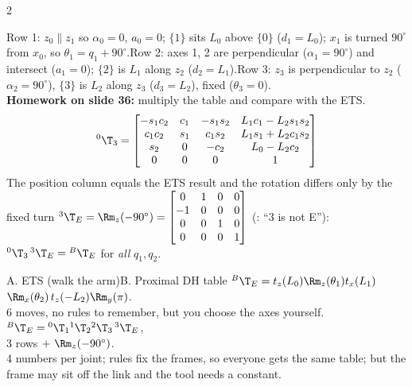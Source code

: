 \begin{multicols}{2}
\columnbreak
{}
\begin{worked}
\begin{center}\end{center}
Row 1: $z_0\parallel z_1$ so $\alpha_0=0$, $a_0=0$; $\{1\}$ sits $L_0$ above $\{0\}$ ($d_1=L_0$); $x_1$ is turned $90^\circ$ from $x_0$, so $\theta_1=q_1+90^\circ$.\quad Row 2: axes 1, 2 are perpendicular ($\alpha_1=90^\circ$) and intersect ($a_1=0$); $\{2\}$ is $L_1$ along $z_2$ ($d_2=L_1$).\quad Row 3: $z_3$ is perpendicular to $z_2$ ($\alpha_2=90^\circ$), $\{3\}$ is $L_2$ along $z_3$ ($d_3=L_2$), fixed ($\theta_3=0$).\\[2pt]
\textbf{Homework on slide 36:} multiply the table and compare with the ETS.
\[{}^0\T_3=\begin{bmatrix}-s_1c_2&c_1&-s_1s_2&L_1c_1-L_2s_1s_2\\c_1c_2&s_1&c_1s_2&L_1s_1+L_2c_1s_2\\s_2&0&-c_2&L_0-L_2c_2\\0&0&0&1\end{bmatrix}\]
The position column equals the ETS result and the rotation differs only by the fixed turn ${}^3\T_E=\Rm_z(-90^\circ)=\begin{bmatrix}0&1&0&0\\-1&0&0&0\\0&0&1&0\\0&0&0&1\end{bmatrix}$ (: ``{3} is not {E}''): ${}^0\T_3\,{}^3\T_E={}^B\T_E$ for \emph{all} $q_1,q_2$. \chk
\end{worked}
\begin{twoway}{A. ETS (walk the arm)}{B. Proximal DH table}
${}^B\T_E=t_z(L_0)\Rm_z(\theta_1)t_x(L_1)$\\ $\Rm_x(\theta_2)\,t_z(-L_2)\Rm_y(\pi)$.\\
6 moves, no rules to remember, but you choose the axes yourself.
\tcblower
${}^B\T_E={}^0\T_1{}^1\T_2{}^2\T_3\,{}^3\T_E$,\\ 3 rows $+\ \Rm_z(-90^\circ)$.\\
4 numbers per joint; rules fix the frames, so everyone gets the same table; but the frame may sit off the link and the tool needs a constant.
\end{twoway}


\end{multicols}

